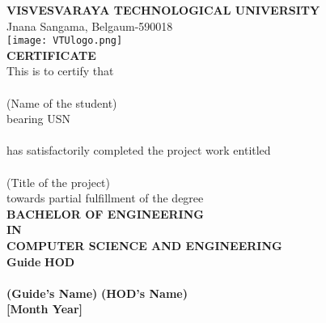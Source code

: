 \documentclass[12pt,a4paper]{report}
\begin{document}
\begin{center}

\textbf{\large VISVESVARAYA TECHNOLOGICAL UNIVERSITY}\\
{\normalsize Jnana Sangama, Belgaum-590018}\\
\vspace{0.3in}
\texttt{[image: VTUlogo.png]}\\
\vspace{0.3in}
\textbf{CERTIFICATE}\\
\vspace{0.3in}
This is to certify that\\
\vspace{0.1in}
\underline{\hspace{10cm}}\\
(Name of the student)\\
\vspace{0.1in}
bearing USN\\
\vspace{0.1in}
\underline{\hspace{10cm}}\\
\vspace{0.1in}
has satisfactorily completed the project work entitled\\
\vspace{0.1in}
\underline{\hspace{10cm}}\\
(Title of the project)\\
\vspace{0.1in}
towards partial fulfillment of the degree\\
\vspace{0.1in}
\textbf{BACHELOR OF ENGINEERING\\IN\\COMPUTER SCIENCE AND ENGINEERING}\\
\vspace{0.4in}
\textbf{Guide} \hspace{3in} \textbf{HOD}\\
\vspace{0.2in}
\underline{\hspace{6cm}} \hspace{1.5in} \underline{\hspace{6cm}}\\
\textbf{(Guide's Name)} \hspace{2in} \textbf{(HOD's Name)}\\
\vspace{0.1in}
\textbf{[Month Year]} %

\end{center}
\end{document}
